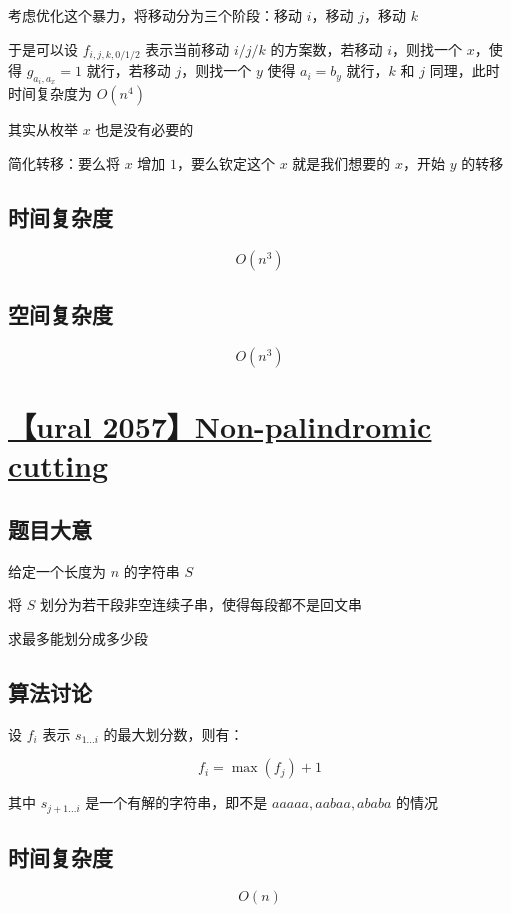 \documentclass[UTF8]{article}
\begin{document}
考虑优化这个暴力，将移动分为三个阶段：移动 $i$，移动 $j$，移动 $k$

于是可以设 $f_{i,j,k,0/1/2}$ 表示当前移动 $i/j/k$ 的方案数，若移动 $i$，则找一个 $x$，使得 $g_{a_i,a_x}=1$ 就行，若移动 $j$，则找一个 $y$ 使得 $a_i=b_y$ 就行，$k$ 和 $j$ 同理，此时时间复杂度为 $O(n^4)$

其实从枚举 $x$ 也是没有必要的

简化转移：要么将 $x$ 增加 $1$，要么钦定这个 $x$ 就是我们想要的 $x$，开始 $y$ 的转移

\subsection{时间复杂度}

$$
O(n^3)
$$

\subsection{空间复杂度}

$$
O(n^3)
$$

\section{\href{https://vjudge.net/problem/URAL-2057}{【ural 2057】Non-palindromic cutting}}

\subsection{题目大意}

给定一个长度为 $n$ 的字符串 $S$

将 $S$ 划分为若干段非空连续子串，使得每段都不是回文串

求最多能划分成多少段

\subsection{算法讨论}

设 $f_i$ 表示 $s_{1 \dots i}$ 的最大划分数，则有：

$$
f_i=\max(f_j)+1
$$

其中 $s_{j+1 \dots i}$ 是一个有解的字符串，即不是 $aaaaa, aabaa, ababa$ 的情况

\subsection{时间复杂度}

$$
O(n)
$$
\end{document}
